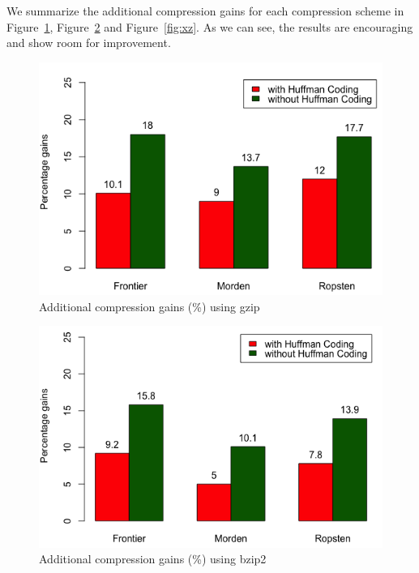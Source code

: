 We summarize the additional compression gains for each compression scheme in Figure~\ref{fig:gzip}, Figure~\ref{fig:bzip2} and Figure~\ref{fig:xz}. 
As we can see, the results are encouraging and show room for improvement.

\pagebreak
\begin{figure}
	\includegraphics[scale=0.45]{plots/gzip}
	\caption{Additional compression gains (\%) using gzip}
	\label{fig:gzip}
\end{figure}
\begin{figure}
	\includegraphics[scale=0.45]{plots/bzip2}
	\caption{Additional compression gains (\%) using bzip2}
	\label{fig:bzip2}
\end{figure}
